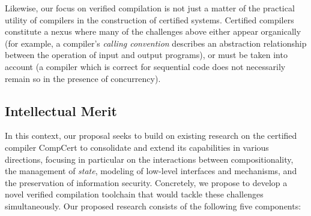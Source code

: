 Likewise,
our focus on verified compilation
is not just a matter of the practical utility of compilers
in the construction of certified systems.
Certified compilers constitute a nexus where
many of the challenges above either appear organically
(for example,
a compiler's \emph{calling convention} describes an abstraction relationship
between the operation of input and output programs),
or must be taken into account
(a compiler which is correct for sequential code
does not necessarily remain so in the presence of concurrency).

\subsection{Intellectual Merit}
\label{ssec:intro-itm}

In this context,
our proposal seeks to build on existing research
on the certified compiler CompCert
to consolidate and extend its capabilities in various directions,
focusing in particular on the interactions between
compositionality,
the management of \emph{state},
modeling of low-level interfaces and mechanisms, and
the preservation of information security.
%
%
Concretely,
we propose to develop a novel verified compilation
toolchain that would tackle these challenges simultaneously. Our
proposed research consists of the following five components:
